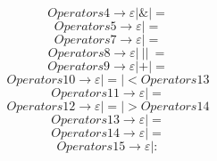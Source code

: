 \documentclass{article}
\begin{document}
\begin{equation}
	Operators4 \rightarrow \varepsilon | \& | =
\end{equation}
\begin{equation}
	Operators5 \rightarrow \varepsilon | =
\end{equation}
\begin{equation}
	Operators7 \rightarrow \varepsilon | =
\end{equation}
\begin{equation}
	Operators8 \rightarrow \varepsilon | \ | | \ =
\end{equation}
\begin{equation}
	Operators9 \rightarrow \varepsilon | + | =
\end{equation}
\begin{equation}
	Operators10 \rightarrow \varepsilon | = | < Operators13
\end{equation}
\begin{equation}
	Operators11 \rightarrow \varepsilon | =
\end{equation}
\begin{equation}
	Operators12 \rightarrow \varepsilon | = | > Operators14
\end{equation}
\begin{equation}
	Operators13 \rightarrow \varepsilon | =
\end{equation}
\begin{equation}
	Operators14 \rightarrow \varepsilon | =
\end{equation}
\begin{equation}
	Operators15 \rightarrow \varepsilon | \colon
\end{equation}
\end{document}
